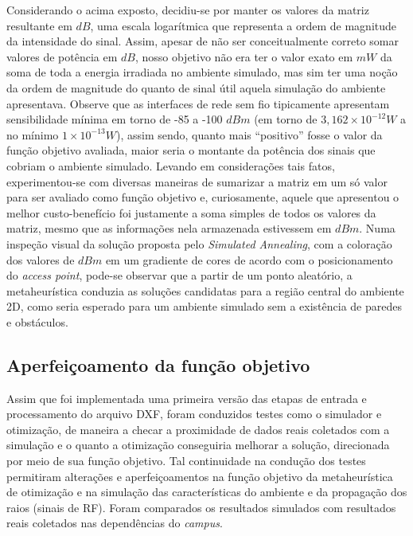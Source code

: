 \documentclass[
	12pt,				%
	twoside,			%
	a4paper,			%
	english,			%
	french,				%
	spanish,			%
	brazil				%
	]{abntex2}
\begin{document}
Considerando o acima exposto, decidiu-se por manter os valores da matriz
resultante em \(dB\), uma escala logarítmica que representa a ordem de
magnitude da intensidade do sinal. Assim, apesar de não ser
conceitualmente correto somar valores de potência em \(dB\), nosso
objetivo não era ter o valor exato em \(mW\) da soma de toda a energia
irradiada no ambiente simulado, mas sim ter uma noção da ordem de
magnitude do quanto de sinal útil aquela simulação do ambiente
apresentava. Observe que as interfaces de rede sem fio tipicamente
apresentam sensibilidade mínima em torno de -85 a -100 \(dBm\) (em torno
de \(3,162\times10^{-12} W\) a no mínimo \(1\times10^{-13} W\)), assim
sendo, quanto mais ``positivo'' fosse o valor da função objetivo
avaliada, maior seria o montante da potência dos sinais que cobriam o
ambiente simulado. Levando em considerações tais fatos, experimentou-se
com diversas maneiras de sumarizar a matriz em um só valor para ser
avaliado como função objetivo e, curiosamente, aquele que apresentou o
melhor custo-benefício foi justamente a soma simples de todos os valores
da matriz, mesmo que as informações nela armazenada estivessem em
\(dBm\). Numa inspeção visual da solução proposta pelo \emph{Simulated
Annealing}, com a coloração dos valores de \(dBm\) em um gradiente de
cores de acordo com o posicionamento do \emph{access point}, pode-se
observar que a partir de um ponto aleatório, a metaheurística conduzia
as soluções candidatas para a região central do ambiente 2D, como seria
esperado para um ambiente simulado sem a existência de paredes e
obstáculos.

\subsection{Aperfeiçoamento da função
objetivo}\label{aperfeiuxe7oamento-da-funuxe7uxe3o-objetivo}

Assim que foi implementada uma primeira versão das etapas de entrada e
processamento do arquivo DXF, foram conduzidos testes como o simulador e
otimização, de maneira a checar a proximidade de dados reais coletados
com a simulação e o quanto a otimização conseguiria melhorar a solução,
direcionada por meio de sua função objetivo. Tal continuidade na
condução dos testes permitiram alterações e aperfeiçoamentos na função
objetivo da metaheurística de otimização e na simulação das
características do ambiente e da propagação dos raios (sinais de RF).
Foram comparados os resultados simulados com resultados reais coletados
nas dependências do \emph{campus}.
\end{document}
